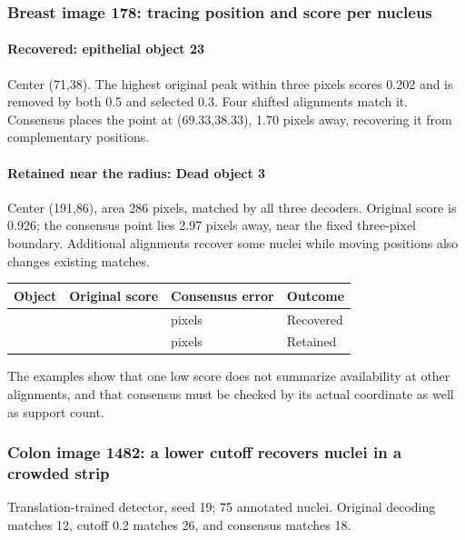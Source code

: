 \documentclass[
  12pt,
]{article}
\newcounter{none} %
\begin{document}
\subsubsection{Breast image 178: tracing position and score per nucleus}\label{chapter26}
\paragraph{Recovered: epithelial object 23}
Center (71,38). The highest original peak within three pixels scores 0.202 and is removed by both 0.5 and selected 0.3. Four shifted alignments match it. Consensus places the point at (69.33,38.33), 1.70 pixels away, recovering it from complementary positions.

\paragraph{Retained near the radius: Dead object 3}
Center (191,86), area 286 pixels, matched by all three decoders. Original score is 0.926; the consensus point lies 2.97 pixels away, near the fixed three-pixel boundary. Additional alignments recover some nuclei while moving positions also changes existing matches.

{\def\LTcaptype{none}
\begin{longtable}[]{@{}
  >{\raggedright\arraybackslash}p{}
  >{\raggedleft\arraybackslash}p{}
  >{\raggedright\arraybackslash}p{}
  >{\raggedright\arraybackslash}p{}@{}}
\toprule\noalign{}
Object & Original score & Consensus error & Outcome\\
\midrule\noalign{}
\endhead
\bottomrule\noalign{}
\endlastfoot
23 & 0.202 & 1.70 pixels & Recovered\\
3 & 0.926 & 2.97 pixels & Retained\\
\end{longtable}}
The examples show that one low score does not summarize availability at other alignments, and that consensus must be checked by its actual coordinate as well as support count.

\subsubsection{Colon image 1482: a lower cutoff recovers nuclei in a crowded strip}\label{chapter27}
Translation-trained detector, seed 19; 75 annotated nuclei. Original decoding matches 12, cutoff 0.2 matches 26, and consensus matches 18.
\end{document}
